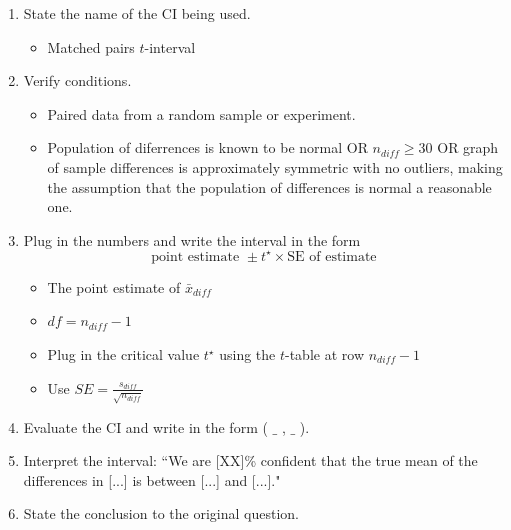 
\begin{termBox}{\vspace{-1mm}
\begin{enumerate}
\setlength{\itemsep}{0mm}
\item State the name of the CI being used.\vspace{-1.5mm}
\begin{itemize}
\setlength{\itemsep}{0mm}
\item Matched pairs $t$-interval
\end{itemize}
\item Verify conditions.\vspace{-1.5mm}
\begin{itemize}
\setlength{\itemsep}{0mm}
\item Paired data from a random sample or experiment.
\item Population of diferrences is known to be normal OR $n_{diff}\ge 30$ OR graph of sample differences is approximately symmetric with no outliers, making the assumption that the population of differences is normal a reasonable one.
\end{itemize}
\item Plug in the numbers and write the interval in the form
$$\text{point estimate } \pm t^\star \times \text{SE of estimate}$$
\begin{itemize}
\setlength{\itemsep}{0mm}
\item The point estimate of $\bar{x}_{diff}$
\item $df=n_{diff}-1$
\item Plug in the critical value $t^\star$ using the $t$-table at row $n_{diff}-1$
\item Use $SE = \frac{s_{diff}}{\sqrt{n_{diff}}}$
\end{itemize}
\item Evaluate the CI and write in the form ( $\_$ , $\_$ ).
\item Interpret the interval: ``We are [XX]\% confident that the true mean of the differences in [...] is between [...] and [...]."
\item State the conclusion to the original question.
\end{enumerate}}
\end{termBox}

